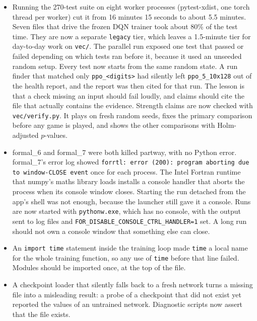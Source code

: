 \begin{itemize}
  \item Running the 270-test suite on eight worker processes (pytest-xdist, one torch thread per
        worker) cut it from 16 minutes 15 seconds to about 5.5 minutes. Seven files that drive the
        frozen DQN trainer took about 80\% of the test time. They are now a separate
        \texttt{legacy} tier, which leaves a 1.5-minute tier for day-to-day work on
        \texttt{vec/}. The parallel run exposed one test that passed or failed depending on
        which tests ran before it, because it used an unseeded random setup. Every test now
        starts from the same random state. A run finder that matched only \texttt{ppo\_<digits>}
        had silently left \texttt{ppo\_5\_10x128} out of the health report, and the report was
        then cited for that run. The lesson is that a check missing an input should fail loudly,
        and claims should cite the file that actually contains the evidence. Strength claims are
        now checked with \texttt{vec/verify.py}. It plays on fresh random seeds, fixes the primary
        comparison before any game is played, and shows the other comparisons with Holm-adjusted
        $p$-values.
  \item formal\_6 and formal\_7 were both killed partway, with no Python error. formal\_7's error
        log showed \texttt{forrtl: error (200): program aborting due to window-CLOSE event} once
        for each process. The Intel Fortran runtime that numpy's maths library loads installs a
        console handler that aborts the process when its console window closes. Starting the run
        detached from the app's shell was not enough, because the launcher still gave it a
        console. Runs are now started with \texttt{pythonw.exe}, which has no console, with the
        output sent to log files and \texttt{FOR\_DISABLE\_CONSOLE\_CTRL\_HANDLER=1} set. A
        long run should not own a console window that something else can close.
  \item An \texttt{import time} statement inside the training loop made \texttt{time} a local
        name for the whole training function, so any use of \texttt{time} before that line
        failed. Modules should be imported once, at the top of the file.
  \item A checkpoint loader that silently falls back to a fresh network turns a missing file into
        a misleading result: a probe of a checkpoint that did not exist yet reported the values of
        an untrained network. Diagnostic scripts now assert that the file exists.

\end{itemize}

